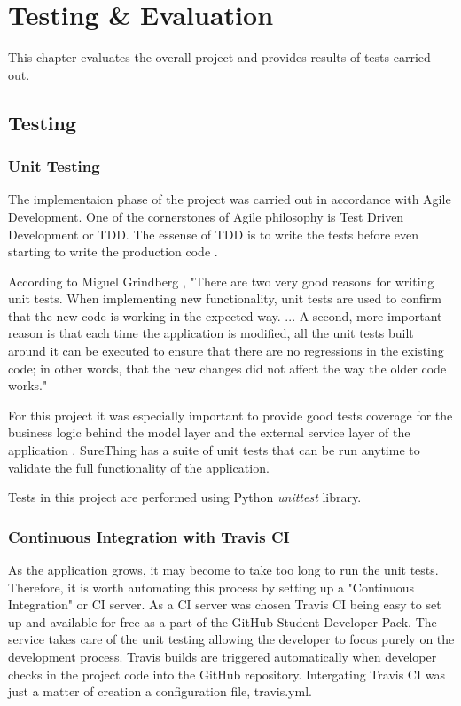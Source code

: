 \chapter{Testing \& Evaluation}\label{ch:TestAndEval}

This chapter evaluates the overall project and provides results of tests carried out.

\section{Testing}
\subsection{Unit Testing}
The implementaion phase of the project was carried out in accordance with Agile Development. One of the cornerstones of Agile philosophy is Test Driven Development or TDD. The essense of TDD is to write the tests before even starting to write the production code . 

According to Miguel Grindberg \citep{book:Grindberg2014FlaskWebDevelopment}, "There are two very good reasons for writing unit tests. When implementing new functionality, unit tests are used to confirm that the new code is working in the expected way. ... A second, more important reason is that each time the application is modified, all the unit tests built around it can be executed to ensure that there are no regressions  in the existing code; in other words, that the new changes did not affect the way the older code works."

 For this project it was especially important to provide good tests coverage for the business logic behind the model layer and the external service layer of the application \cite{sec:applicationarchitecture}. SureThing has a suite of unit tests that can be run anytime to validate the full functionality of the application.

Tests in this project are performed using Python \emph{unittest} library. 

\subsection{Continuous Integration with Travis CI}
As the application grows, it may become to take too long to run the unit tests. Therefore, it is worth automating this process by setting up a "Continuous Integration" or CI server. As a CI server was chosen Travis CI being easy to set up and available for free as a part of the GitHub Student Developer Pack. 
The service takes care of the unit testing allowing the developer to focus purely on the development process. Travis builds are triggered automatically when developer checks in the project code into the GitHub repository. Intergating Travis CI was just a matter of creation a configuration file, travis.yml. 

